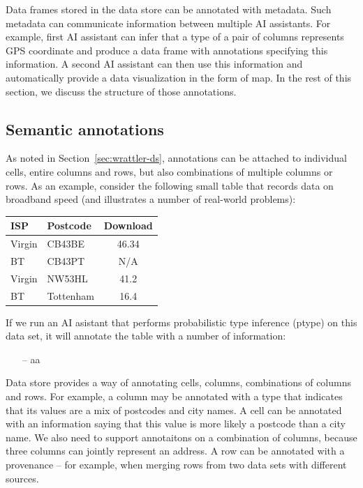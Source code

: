 \documentclass[sigplan,preprint,10pt]{acmart}\settopmatter{printfolios=true,printccs=false,printacmref=false}
\theoremstyle{plain}
\theoremstyle{definition}
\begin{document}
{Data frames stored in the data store can be annotated with metadata. Such metadata can
communicate information between multiple AI assistants. For example, first AI assistant can
infer that a type of a pair of columns represents GPS coordinate and produce a data frame
with annotations specifying this information. A second AI assistant can then use this information
and automatically provide a data visualization in the form of map. In the rest of this section,
we discuss the structure of those annotations.

\subsection{Semantic annotations}
As noted in Section~\ref{sec:wrattler-ds}, annotations can be attached to individual cells,
entire columns and rows, but also combinations of multiple columns or rows. As an example,
consider the following small table that records data on broadband speed (and illustrates a number
of real-world problems):

\vspace{1em}
\noindent
\begin{tabular}{llc}
\toprule
\textbf{ISP}\qquad\qquad\qquad & \textbf{Postcode}\qquad\qquad & \textbf{Download} \\
\midrule
Virgin & CB43BE & 46.34 \\
BT & CB43PT & N/A \\
Virgin & NW53HL & 41.2 \\
BT & Tottenham & 16.4 \\
\bottomrule
\end{tabular}
\vspace{1em}

\noindent
If we run an AI asistant that performs probabilistic type inference (ptype) on this data set,
it will annotate the table with a number of information:
\begin{itemize}
\item[--] aa
\end{itemize}

{\color{red}
Data store provides a way of annotating cells, columns, combinations of columns and rows.
For example, a column may be annotated with a type that indicates that its values are a mix of
postcodes and city names. A cell can be annotated with an information saying that this value is
more likely a postcode than a city name. We also need to support annotaitons on a combination of
columns, because three columns can jointly represent an address. A row can be annotated with a
provenance -- for example, when merging rows from two data sets with different sources.
}

}
\end{document}
